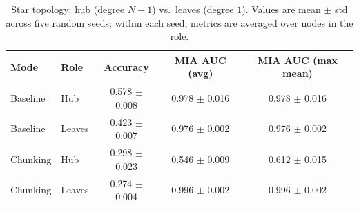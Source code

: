 \begin{table}[t]
  \centering
  \caption{Star topology: hub (degree $N{-}1$) vs.\ leaves (degree $1$). Values are mean $\pm$ std across five random seeds; within each seed, metrics are averaged over nodes in the role.}
  \label{tab:star_hub_leaf}
  \begin{tabular}{@{}l l ccc@{}}
    \toprule
    Mode & Role & Accuracy & MIA AUC (avg) & MIA AUC (max mean)\tabularnewline
    \midrule
    Baseline & Hub & 0.578 $\pm$ 0.008 & 0.978 $\pm$ 0.016 & 0.978 $\pm$ 0.016\tabularnewline
    Baseline & Leaves & 0.423 $\pm$ 0.007 & 0.976 $\pm$ 0.002 & 0.976 $\pm$ 0.002\tabularnewline
    \midrule
    Chunking & Hub & 0.298 $\pm$ 0.023 & 0.546 $\pm$ 0.009 & 0.612 $\pm$ 0.015\tabularnewline
    Chunking & Leaves & 0.274 $\pm$ 0.004 & 0.996 $\pm$ 0.002 & 0.996 $\pm$ 0.002\tabularnewline
    \bottomrule
  \end{tabular}
\end{table}
